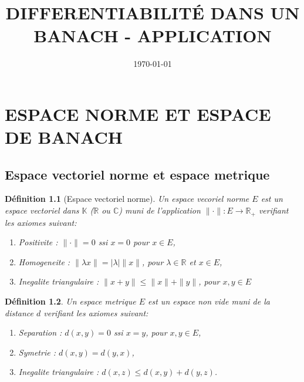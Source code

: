 \documentclass[a4paper, 12pt, french]{report}
\title{DIFFERENTIABILITÉ DANS UN BANACH - APPLICATION}
\author{}
\date{\today}
\theoremstyle{break}
\newtheorem{defin}{Définition}[section]
\begin{document}
\maketitle

\tableofcontents

\chapter{ESPACE NORME ET ESPACE DE BANACH}

\section{Espace vectoriel norme et espace metrique}
\begin{defin}[Espace vectoriel norme]
    Un espace vecoriel norme $E$ est un espace vectoriel dans $\mathbb{K}$ ($\mathbb{R}$ ou $\mathbb{C}$) muni de l'application $\| \cdot \| : E \rightarrow \mathbb{R}_{+}$ verifiant les axiomes suivant:
    \begin{enumerate}
        \item Positivite : $\| \cdot \| = 0$ ssi $x = 0$ pour $x \in E$,
        \item Homogeneite : $\| \lambda x \| = |\lambda| \|x\|$, pour $\lambda \in \mathbb{R}$ et $x \in E$,
        \item Inegalite triangulaire : $\| x + y \| \leq \|x\| + \|y\|$, pour $x, y \in E$
    \end{enumerate}
\end{defin}

\begin{defin}
    Un espace metrique $E$ est un espace non vide muni de la distance $d$ verifiant les axiomes suivant:
    \begin{enumerate}
        \item Separation : $d(x,y) = 0$ ssi $x=y$, pour $x, y \in E$,
        \item Symetrie : $d(x,y)=d(y,x)$,
        \item Inegalite triangulaire : $d(x,z) \leq d(x, y) + d(y,z)$.
    \end{enumerate}
\end{defin}
\end{document}
